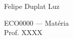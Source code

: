 \begin{frame}[plain]
  \begin{center}

    {\Huge
    \textbf{
    \color{unbblue}
    \inserttitle
    }
    }

    {\Large
    \color{gray}
    \insertsubtitle
    }

    \vspace{0.7cm}

    {\large
    Felipe Duplat Luz
    }

    \vspace{1cm}

    {\normalsize
    ECO0000 --- Matéria \\
    Prof. XXXX
    }

    \vfill

    {\small
    \insertdate
    }

  \end{center}

\end{frame}


